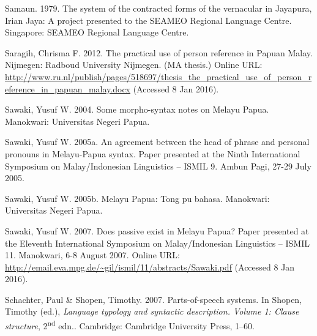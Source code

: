 \begin{styleCitaviBibliographyEntry}
Samaun. 1979. The system of the contracted forms of the vernacular  in Jayapura, Irian Jaya: A project presented to the SEAMEO Regional Language Centre. Singapore: SEAMEO Regional Language Centre.
\end{styleCitaviBibliographyEntry}

\begin{styleCitaviBibliographyEntry}
Saragih, Chrisma F. 2012. The practical use of person reference in Papuan Malay. Nijmegen: Radboud University Nijmegen. (MA thesis.) Online URL: \url{http://www.ru.nl/publish/pages/518697/thesis_the_practical_use_of_person_reference_in_papuan_malay.docx} (Accessed 8 Jan 2016).
\end{styleCitaviBibliographyEntry}

\begin{styleCitaviBibliographyEntry}
Sawaki, Yusuf W. 2004. Some morpho-syntax notes on Melayu Papua. Manokwari: Universitas Negeri Papua.
\end{styleCitaviBibliographyEntry}

\begin{styleCitaviBibliographyEntry}
Sawaki, Yusuf W. 2005a. An agreement between the head of  phrase and personal pronouns in Melayu-Papua syntax. Paper presented at the Ninth International Symposium on Malay/Indonesian Linguistics – ISMIL 9. Ambun Pagi, 27-29 July 2005.
\end{styleCitaviBibliographyEntry}

\begin{styleCitaviBibliographyEntry}
Sawaki, Yusuf W. 2005b. Melayu Papua: Tong pu bahasa. Manokwari: Universitas Negeri Papua.
\end{styleCitaviBibliographyEntry}

\begin{styleCitaviBibliographyEntry}
Sawaki, Yusuf W. 2007. Does passive exist in Melayu Papua? Paper presented at the Eleventh International Symposium on Malay/Indonesian Linguistics – ISMIL 11. Manokwari, 6-8 August 2007. Online URL: \url{http://email.eva.mpg.de/~gil/ismil/11/abstracts/Sawaki.pdf} (Accessed 8 Jan 2016).
\end{styleCitaviBibliographyEntry}

\begin{styleCitaviBibliographyEntry}
Schachter, Paul \& Shopen, Timothy. 2007. Parts-of-speech systems. In Shopen, Timothy (ed.), \textit{Language typology and syntactic description. Volume 1: Clause structure}, 2\textsuperscript{nd} edn.. Cambridge: Cambridge University Press, 1–60.
\end{styleCitaviBibliographyEntry}

